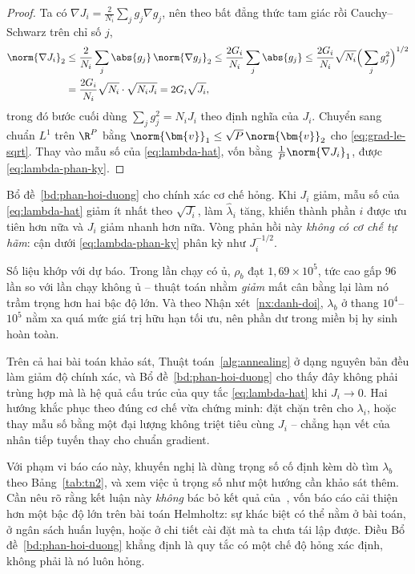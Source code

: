 \begin{proof}
Ta có $\nabla J_i = \frac{2}{N_i}\sum_j g_j \nabla g_j$, nên theo bất đẳng thức
tam giác rồi Cauchy--Schwarz trên chỉ số $j$,
\begin{align*}
\norm{\nabla J_i}_{2}
 &\le \frac{2}{N_i}\sum_j \abs{g_j}\,\norm{\nabla g_j}_2
  \le \frac{2G_i}{N_i}\sum_j \abs{g_j}
  \le \frac{2G_i}{N_i}\sqrt{N_i}\Big(\sum_j g_j^2\Big)^{1/2}\\
 &= \frac{2G_i}{N_i}\sqrt{N_i}\cdot\sqrt{N_i J_i}
  = 2G_i\sqrt{J_i},
\end{align*}
trong đó bước cuối dùng $\sum_j g_j^2 = N_i J_i$ theo định nghĩa của $J_i$.
Chuyển sang chuẩn $L^1$ trên $\R^P$ bằng
$\norm{\bm{v}}_1 \le \sqrt{P}\,\norm{\bm{v}}_2$ cho
\eqref{eq:grad-le-sqrt}. Thay vào mẫu số của \eqref{eq:lambda-hat}, vốn bằng
$\tfrac{1}{P}\norm{\nabla J_i}_1$, được \eqref{eq:lambda-phan-ky}.
\end{proof}
 
Bổ đề~\ref{bd:phan-hoi-duong} cho chính xác cơ chế hỏng. Khi $J_i$ giảm, mẫu số
của \eqref{eq:lambda-hat} giảm ít nhất theo $\sqrt{J_i}$, làm $\hat{\lambda}_i$
tăng, khiến thành phần $i$ được ưu tiên hơn nữa và $J_i$ giảm nhanh hơn nữa. Vòng
phản hồi này \emph{không có cơ chế tự hãm}: cận dưới \eqref{eq:lambda-phan-ky}
phân kỳ như $J_i^{-1/2}$.
 
Số liệu khớp với dự báo. Trong lần chạy có ủ, $\rho_b$ đạt $1{,}69\times10^5$, tức
cao gấp $96$ lần so với lần chạy không ủ -- thuật toán nhằm \emph{giảm} mất cân bằng lại
làm nó trầm trọng hơn hai bậc độ lớn. Và theo
Nhận xét~\ref{nx:danh-doi}, $\lambda_b$ ở thang $10^4$--$10^5$ nằm xa quá mức giá
trị hữu hạn tối ưu, nên phần dư trong miền bị hy sinh hoàn toàn.
 
\begin{nhanxet}
\label{nx:ket-luan-anneal}
Trên cả hai bài toán khảo sát, Thuật toán~\ref{alg:annealing} ở dạng nguyên bản
đều làm giảm độ chính xác, và Bổ đề~\ref{bd:phan-hoi-duong} cho thấy đây không
phải trùng hợp mà là hệ quả cấu trúc của quy tắc \eqref{eq:lambda-hat} khi
$J_i \to 0$. Hai hướng khắc phục theo đúng cơ chế vừa chứng minh: đặt chặn trên
cho $\lambda_i$, hoặc thay mẫu số bằng một đại lượng không triệt tiêu cùng $J_i$
-- chẳng hạn vết của nhân tiếp tuyến thay cho chuẩn gradient.
 
Với phạm vi báo cáo này, khuyến nghị là dùng trọng số cố định kèm dò tìm
$\lambda_b$ theo Bảng~\ref{tab:tn2}, và xem việc ủ trọng số như một hướng cần khảo
sát thêm. Cần nêu rõ rằng kết luận này \emph{không} bác bỏ kết quả
của~\cite{wang2021}, vốn báo cáo cải thiện hơn một bậc độ lớn trên bài toán
Helmholtz: sự khác biệt có thể nằm ở bài toán, ở ngân sách huấn luyện, hoặc ở chi
tiết cài đặt mà ta chưa tái lập được. Điều Bổ đề~\ref{bd:phan-hoi-duong} khẳng
định là quy tắc có một chế độ hỏng xác định, không phải là nó luôn hỏng.
\end{nhanxet}
 
